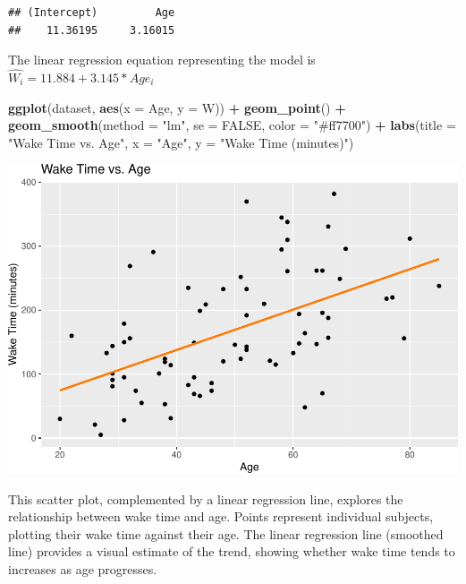 \documentclass[
]{article}
\newenvironment{Shaded}{\begin{snugshade}}{\end{snugshade}}
\newcommand{\AttributeTok}[1]{\textcolor[rgb]{0.13,0.29,0.53}{#1}}
\newcommand{\ConstantTok}[1]{\textcolor[rgb]{0.56,0.35,0.01}{#1}}
\newcommand{\FunctionTok}[1]{\textcolor[rgb]{0.13,0.29,0.53}{\textbf{#1}}}
\newcommand{\NormalTok}[1]{#1}
\newcommand{\SpecialCharTok}[1]{\textcolor[rgb]{0.81,0.36,0.00}{\textbf{#1}}}
\newcommand{\StringTok}[1]{\textcolor[rgb]{0.31,0.60,0.02}{#1}}
\begin{document}
\begin{verbatim}
## (Intercept)         Age 
##    11.36195     3.16015
\end{verbatim}

The linear regression equation representing the model is
\(\hat{W_{i}} = 11.884 + 3.145*Age_{i}\)

\begin{Shaded}
\begin{Highlighting}[]
\FunctionTok{ggplot}\NormalTok{(dataset, }\FunctionTok{aes}\NormalTok{(}\AttributeTok{x =}\NormalTok{ Age, }\AttributeTok{y =}\NormalTok{ W)) }\SpecialCharTok{+} \FunctionTok{geom\_point}\NormalTok{() }\SpecialCharTok{+} \FunctionTok{geom\_smooth}\NormalTok{(}\AttributeTok{method =} \StringTok{"lm"}\NormalTok{,}
    \AttributeTok{se =} \ConstantTok{FALSE}\NormalTok{, }\AttributeTok{color =} \StringTok{"\#ff7700"}\NormalTok{) }\SpecialCharTok{+} \FunctionTok{labs}\NormalTok{(}\AttributeTok{title =} \StringTok{"Wake Time vs. Age"}\NormalTok{,}
    \AttributeTok{x =} \StringTok{"Age"}\NormalTok{, }\AttributeTok{y =} \StringTok{"Wake Time (minutes)"}\NormalTok{)}
\end{Highlighting}
\end{Shaded}

\includegraphics{602_project_files/figure-latex/unnamed-chunk-19-1.pdf}

This scatter plot, complemented by a linear regression line, explores
the relationship between wake time and age. Points represent individual
subjects, plotting their wake time against their age. The linear
regression line (smoothed line) provides a visual estimate of the trend,
showing whether wake time tends to increases as age progresses.
\end{document}
